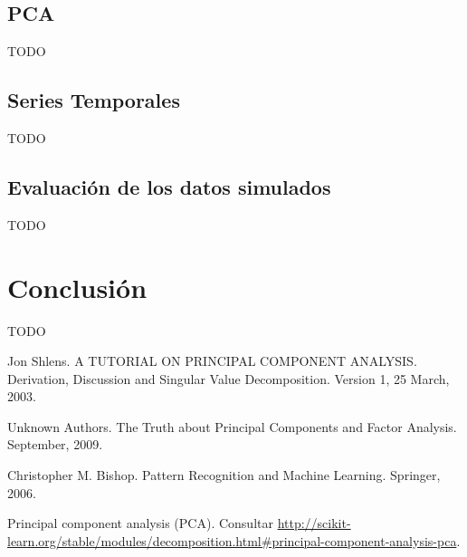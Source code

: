 \documentclass[11pt,spanish,listoffigures,listoftables]{tfgetsinf}
\begin{document}
\section{PCA}
TODO

\section{Series Temporales}
TODO

\section{Evaluación de los datos simulados}
TODO


\chapter{Conclusi\'on}

TODO


\begin{thebibliography}{10}

   Jon Shlens.
   \newblock A TUTORIAL ON PRINCIPAL COMPONENT ANALYSIS. Derivation, Discussion and Singular Value Decomposition.
   \newblock Version 1, 25 March, 2003.

   Unknown Authors.
   \newblock The Truth about Principal Components and Factor Analysis.
    September, 2009.
   
   Christopher M. Bishop.
   \newblock Pattern Recognition and Machine Learning.
   \newblock Springer, 2006.

   Principal component analysis (PCA). 
   \newblock Consultar 
   \url{http://scikit-learn.org/stable/modules/decomposition.html#principal-component-analysis-pca}.

\end{thebibliography}
\cleardoublepage
\end{document}

